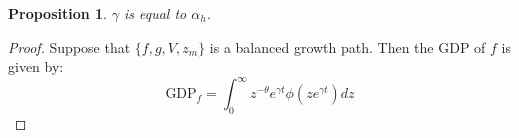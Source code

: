 \documentclass{article}
\newtheorem{proposition}[theorem]{Proposition}
\begin{document}
\begin{proposition}
  \label{gammaeqalpha}
$\gamma$ is equal to $\alpha_h$.
\end{proposition}
\begin{proof}
    Suppose that $\{f,g,V,z_m\}$ is a balanced growth path.  Then the GDP of $f$ is given by:
    \[
        \mbox{GDP}_f = \int_0^\infty z^{-\theta} e^{\gamma t} \phi(z e^{\gamma t}) dz
        \]

\end{proof}



\end{document}

